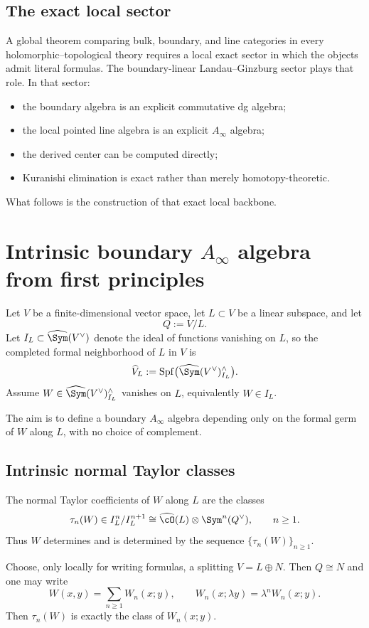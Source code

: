 \subsection{The exact local sector}

A global theorem comparing bulk, boundary, and line categories in every holomorphic--topological theory requires a local exact sector in which the objects admit literal formulas. The boundary-linear Landau--Ginzburg sector plays that role. In that sector:
\begin{itemize}[leftmargin=1.8em]
\item the boundary algebra is an explicit commutative dg algebra;
\item the local pointed line algebra is an explicit $A_\infty$ algebra;
\item the derived center can be computed directly;
\item Kuranishi elimination is exact rather than merely homotopy-theoretic.
\end{itemize}
What follows is the construction of that exact local backbone.


\section{Intrinsic boundary $A_\infty$ algebra from first principles}\label{sec:intrinsic}

Let $V$ be a finite-dimensional vector space, let $L\subset V$ be a linear subspace, and let
\[
Q:=V/L.
\]
Let $I_L\subset \hSym(V^\vee)$ denote the ideal of functions vanishing on $L$, so the completed formal neighborhood of $L$ in $V$ is
\[
\widehat{V}_L:=\Spf\bigl(\hSym(V^\vee)^\wedge_{I_L}\bigr).
\]
Assume $W\in \hSym(V^\vee)^\wedge_{I_L}$ vanishes on $L$, equivalently $W\in I_L$.

The aim is to define a boundary $A_\infty$ algebra depending only on the formal germ of $W$ along $L$, with no choice of complement.

\subsection{Intrinsic normal Taylor classes}

The normal Taylor coefficients of $W$ along $L$ are the classes
\[
\tau_n(W)\in I_L^n/I_L^{n+1}\cong \widehat{\cO}(L)\ot \Sym^n(Q^\vee),
\qquad n\ge 1.
\]
Thus $W$ determines and is determined by the sequence $\{\tau_n(W)\}_{n\ge 1}$.

Choose, only locally for writing formulas, a splitting $V=L\oplus N$. Then $Q\cong N$ and one may write
\[
W(x,y)=\sum_{n\ge 1} W_n(x;y),
\qquad
W_n(x;\lambda y)=\lambda^n W_n(x;y).
\]
Then $\tau_n(W)$ is exactly the class of $W_n(x;y)$.

